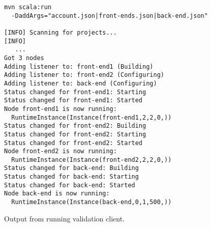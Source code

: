 \begin{figure}[tb]
  \begin{center}
    \begin{verbatim}
mvn scala:run 
  -DaddArgs="account.json|front-ends.json|back-end.json"

[INFO] Scanning for projects...
[INFO]
   ...
Got 3 nodes
Adding listener to: front-end1 (Building)
Adding listener to: front-end2 (Configuring)
Adding listener to: back-end (Configuring)
Status changed for front-end1: Starting
Status changed for front-end1: Started
Node front-end1 is now running: 
  RuntimeInstance(Instance(front-end1,2,2,0,))
Status changed for front-end2: Building
Status changed for front-end2: Starting
Status changed for front-end2: Started
Node front-end2 is now running: 
  RuntimeInstance(Instance(front-end2,2,2,0,))
Status changed for back-end: Building
Status changed for back-end: Starting
Status changed for back-end: Started
Node back-end is now running: 
  RuntimeInstance(Instance(back-end,0,1,500,))
    \end{verbatim}
  \end{center}
  \caption{Output from running validation client.}
  \label{list:validation-output}
\end{figure}

